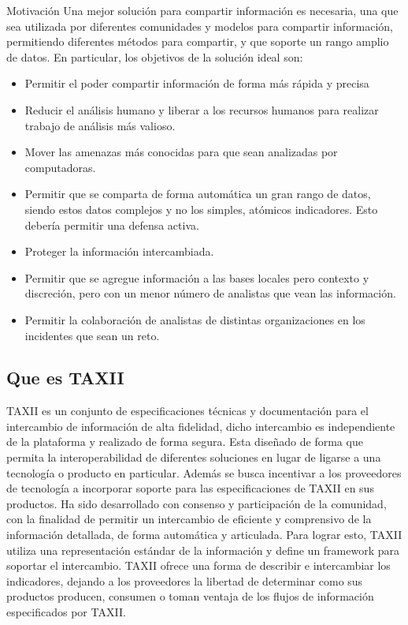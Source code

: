 Motivación
Una mejor solución para compartir información es necesaria, una que sea 
utilizada por diferentes comunidades y modelos para compartir información, 
permitiendo diferentes métodos para compartir, y que soporte un rango amplio de 
datos. En particular, los objetivos de la solución ideal son:
\begin{itemize}
  \item Permitir el poder compartir información de forma más rápida y precisa
  \item Reducir el análisis humano y liberar a los recursos humanos para 
  realizar trabajo de análisis más valioso.
  \item Mover las amenazas más conocidas para que sean analizadas por 
  computadoras.
  \item Permitir que se comparta de forma automática un gran rango de datos, 
  siendo estos datos complejos y no los simples, atómicos indicadores. Esto 
  debería permitir una defensa activa.
  \item Proteger la información intercambiada.
  \item Permitir que se agregue información a las bases locales pero contexto y 
  discreción, pero con un menor número de analistas que vean las información.
  \item Permitir la colaboración de analistas de distintas organizaciones en los 
  incidentes que sean un reto.
  \end{itemize}
  
 \subsection{Que es TAXII}
 TAXII es un conjunto de especificaciones técnicas y documentación para el 
 intercambio de información de alta fidelidad, dicho intercambio es 
 independiente de la plataforma y realizado de forma segura. Esta diseñado de 
 forma que permita la interoperabilidad de diferentes soluciones en lugar de 
 ligarse a una tecnología o producto en particular. Además se busca incentivar a 
 los proveedores de tecnología a incorporar soporte para las especificaciones de 
 TAXII en sus productos.
 Ha sido desarrollado con consenso y participación de la comunidad, con la 
 finalidad de permitir un intercambio de eficiente y comprensivo de la 
 información detallada, de forma automática y articulada. Para lograr esto, 
 TAXII utiliza una representación estándar de la información y define un 
 framework para soportar el intercambio. TAXII ofrece una forma de describir e 
 intercambiar los indicadores, dejando a los proveedores la libertad de 
 determinar como sus productos producen, consumen o toman ventaja de los flujos 
 de información especificados por TAXII.
 
